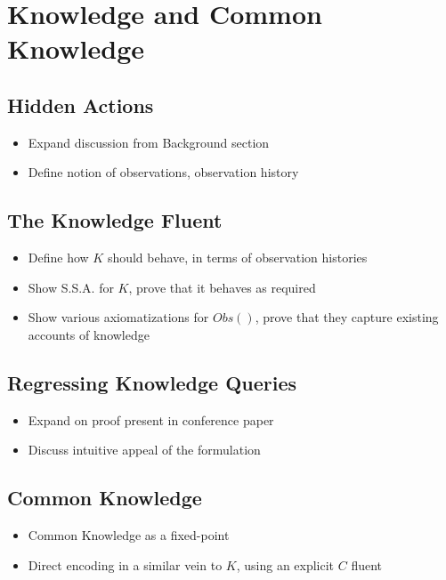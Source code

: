 \chapter{Knowledge and Common Knowledge}\label{ch:knowledge}

\section{Hidden Actions}

\begin{itemize}
\item Expand discussion from Background section
\item Define notion of observations, observation history
\end{itemize}

\section{The Knowledge Fluent}

\begin{itemize}
\item Define how $K$ should behave, in terms of observation histories
\item Show S.S.A. for $K$, prove that it behaves as required
\item Show various axiomatizations for $Obs()$, prove that they capture
existing accounts of knowledge
\end{itemize}

\section{Regressing Knowledge Queries}

\begin{itemize}
\item Expand on proof present in conference paper
\item Discuss intuitive appeal of the formulation
\end{itemize}

\section{Common Knowledge}

\begin{itemize}
\item Common Knowledge as a fixed-point
\item Direct encoding in a similar vein to $K$, using an explicit $C$ fluent
\end{itemize}


